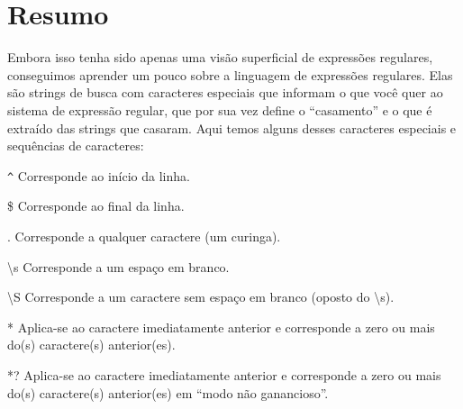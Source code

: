 \section{Resumo}

Embora isso tenha sido apenas uma visão superficial de expressões regulares,
conseguimos aprender um pouco sobre a linguagem de expressões regulares. Elas
são strings de busca com caracteres especiais que informam o que você quer ao
sistema de expressão regular, que por sua vez define o ``casamento'' e o que é
extraído das strings que casaram. Aqui temos alguns desses caracteres especiais
e sequências de caracteres:

\verb"^" \newline
Corresponde ao início da linha.

\$ \newline
Corresponde ao final da linha.

. \newline
Corresponde a qualquer caractere (um curinga).

{\textbackslash}s \newline
Corresponde a um espaço em branco.

{\textbackslash}S \newline
Corresponde a um caractere sem espaço em branco (oposto do {\textbackslash}s).

* \newline
Aplica-se ao caractere imediatamente anterior e corresponde a zero ou mais
do(s) caractere(s) anterior(es).

*? \newline
Aplica-se ao caractere imediatamente anterior e corresponde a zero ou mais
do(s) caractere(s) anterior(es) em ``modo não ganancioso''.

